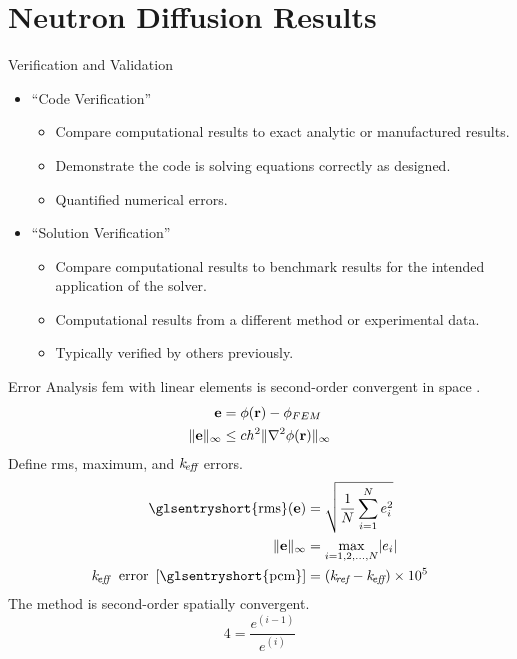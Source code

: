 \section{Neutron Diffusion Results}
\label{sec:diffusionResults}

\begin{frame}{Verification and Validation}
  \begin{itemize}
    \item ``Code Verification''
      \begin{itemize}
        \item Compare computational results to exact analytic or manufactured
          results.
        \item Demonstrate the code is solving equations correctly as designed.
        \item Quantified numerical errors.
      \end{itemize}
    \item ``Solution Verification''
      \begin{itemize}
        \item Compare computational results to benchmark results for the
          intended application of the solver.
        \item Computational results from a different method or experimental
          data.
        \item Typically verified by others previously.
      \end{itemize}
  \end{itemize}
\end{frame}

\begin{frame}{Error Analysis}
  \gls{fem} with linear elements is second-order convergent in space
  \cite{textbookli}.
  \begin{align} 
    \label{eq:error_bound}
    \mathbf{e} &= \phi(\mathbf{r}) - \phi_{FEM} \\
    \|\mathbf{e}\|_{\infty} &\le c h^2 \| \mathbf{\nabla}^2 \phi(\mathbf{r}) \|_{\infty}
  \end{align}
  Define \gls{rms}, maximum, and $k_{\!\mbox{\scriptsize \em eff}}$ errors.
  \begin{align}
    \label{eq:rms}
    \text{\glsentryshort{rms}}(\ve) &= \sqrt{\frac{1}{N} \sum_{i=1}^{N} e_i^2}\\
    \label{eq:infnorm}
    \|\ve\|_{\infty} &= \max_{i=1,2,\ldots,N} \lvert e_i \rvert \\
    \label{eq:keff_err}
    \keff \; \text{ error } \units{\glsentryshort{pcm}} &= (\kref - \keff) \times 10^5
  \end{align}
  The method is second-order spatially convergent.
  \begin{equation}
    4 = \frac{e^{(i-1)}}{e^{(i)}}
  \end{equation}
\end{frame}

